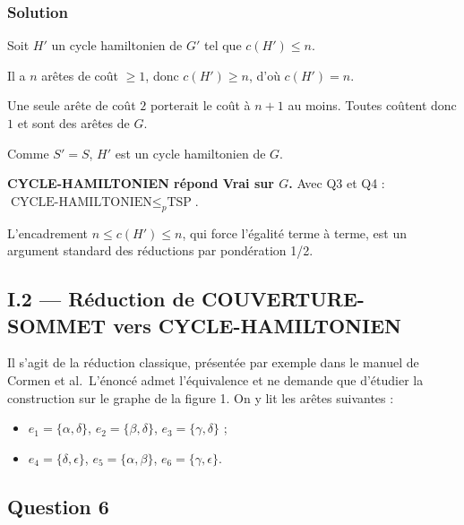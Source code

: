 \documentclass[11pt,a4paper]{article}
\providecommand{\tightlist}{\setlength{\itemsep}{0pt}\setlength{\parskip}{0pt}}
\begin{document}
\hypertarget{solution-4}{%
\subsubsection{Solution}\label{solution-4}}

Soit \(H'\) un cycle hamiltonien de \(G'\) tel que \(c(H')\le n\).

Il a \(n\) arêtes de coût \(\ge 1\), donc \(c(H')\ge n\), d'où \(c(H')=n\).

Une seule arête de coût \(2\) porterait le coût à \(n+1\) au moins. Toutes coûtent donc \(1\) et sont des arêtes de \(G\).

Comme \(S'=S\), \(H'\) est un cycle hamiltonien de \(G\).

\textbf{CYCLE-HAMILTONIEN répond Vrai sur \(G\).} Avec Q3 et Q4 : \(\text{CYCLE-HAMILTONIEN}\le_p\text{TSP}\).

\begin{methode}

L'encadrement \(n\le c(H')\le n\), qui force l'égalité terme à terme, est un argument standard des réductions par pondération 1/2.

\end{methode}

\hypertarget{i.2-ruxe9duction-de-couverture-sommet-vers-cycle-hamiltonien}{%
\subsection{I.2 --- Réduction de COUVERTURE-SOMMET vers CYCLE-HAMILTONIEN}\label{i.2-ruxe9duction-de-couverture-sommet-vers-cycle-hamiltonien}}

Il s'agit de la réduction classique, présentée par exemple dans le manuel de Cormen et al.~L'énoncé admet l'équivalence et ne demande que d'étudier la construction sur le graphe de la figure 1. On y lit les arêtes suivantes :

\begin{itemize}
\tightlist
\item
  \(e_1=\{\alpha,\delta\}\), \(e_2=\{\beta,\delta\}\), \(e_3=\{\gamma,\delta\}\) ;
\item
  \(e_4=\{\delta,\epsilon\}\), \(e_5=\{\alpha,\beta\}\), \(e_6=\{\gamma,\epsilon\}\).
\end{itemize}

\hypertarget{question-6}{%
\subsection{Question 6}\label{question-6}}
\end{document}

